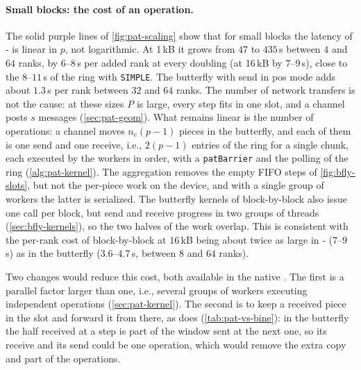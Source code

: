 \paragraph{Small blocks: the cost of an operation.}
The solid purple lines of \cref{fig:pat-scaling} show that for small blocks the latency of \bine{}-\pat{} is linear in $p$, not logarithmic.
At 1\,kB it grows from $47$ to $435$\,\textmu s between $4$ and $64$ ranks, by $6$--$8$\,\textmu s per added rank at every doubling (at 16\,kB by $7$--$9$\,\textmu s), close to the $8$--$11$\,\textmu s of the ring with \texttt{SIMPLE}. The butterfly with send in pos mode adds about $1.3$\,\textmu s per rank between $32$ and $64$ ranks.
The number of network transfers is not the cause: at these sizes $P$ is large, every step fits in one slot, and a channel posts $s$ messages (\cref{sec:pat-geom}).
What remains linear is the number of operations: a channel moves $n_c(p-1)$ pieces in the butterfly, and each of them is one send and one receive, i.e., $2(p-1)$ entries of the ring for a single chunk, each executed by the workers in order, with a \texttt{patBarrier} and the polling of the ring (\cref{alg:pat-kernel}).
The aggregation removes the empty FIFO steps of \cref{fig:bfly-slots}, but not the per-piece work on the device, and with a single group of workers the latter is serialized.
The butterfly kernels of block-by-block also issue one call per block, but send and receive progress in two groups of threads (\cref{sec:bfly-kernels}), so the two halves of the work overlap. This is consistent with the per-rank cost of block-by-block at 16\,kB being about twice as large in \bine{}-\pat{} ($7$--$9$\,\textmu s) as in the butterfly ($3.6$--$4.7$\,\textmu s, between $8$ and $64$ ranks).

Two changes would reduce this cost, both available in the native \pat{}.
The first is a parallel factor larger than one, i.e., several groups of workers executing independent operations (\cref{sec:pat-kernel}). The second is to keep a received piece in the slot and forward it from there, as \pat{} does (\cref{tab:pat-vs-bine}): in the butterfly the half received at a step is part of the window sent at the next one, so its receive and its send could be one operation, which would remove the extra copy and part of the operations.

